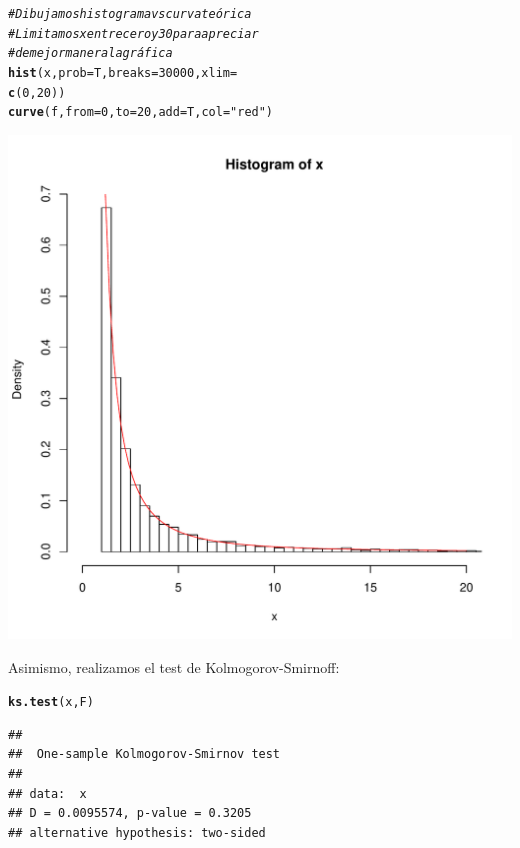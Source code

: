 \documentclass[12 pt]{article}\usepackage[]{graphicx}\usepackage[]{color}
\makeatletter
\def\maxwidth{ %
  \ifdim\Gin@nat@width>\linewidth
    \linewidth
  \else
    \Gin@nat@width
  \fi
}
\newcommand{\hlnum}[1]{\textcolor[rgb]{0.686,0.059,0.569}{#1}}%
\newcommand{\hlstr}[1]{\textcolor[rgb]{0.192,0.494,0.8}{#1}}%
\newcommand{\hlcom}[1]{\textcolor[rgb]{0.678,0.584,0.686}{\textit{#1}}}%
\newcommand{\hlstd}[1]{\textcolor[rgb]{0.345,0.345,0.345}{#1}}%
\newcommand{\hlkwc}[1]{\textcolor[rgb]{0.333,0.667,0.333}{#1}}%
\newcommand{\hlkwd}[1]{\textcolor[rgb]{0.737,0.353,0.396}{\textbf{#1}}}%
\newenvironment{kframe}{%
 \def\at@end@of@kframe{}%
 \ifinner\ifhmode%
  \def\at@end@of@kframe{\end{minipage}}%
  \begin{minipage}{\columnwidth}%
 \fi\fi%
 \def\FrameCommand##1{\hskip\@totalleftmargin \hskip-\fboxsep
 \colorbox{shadecolor}{##1}\hskip-\fboxsep
     \hskip-\linewidth \hskip-\@totalleftmargin \hskip\columnwidth}%
 \MakeFramed {\advance\hsize-\width
   \@totalleftmargin\z@ \linewidth\hsize
   \@setminipage}}%
 {\par\unskip\endMakeFramed%
 \at@end@of@kframe}
\newenvironment{knitrout}{}{} %
\makeatother
\begin{document}
\begin{enumerate}
\begin{knitrout}
\begin{kframe}
\begin{alltt}
    \hlcom{# Dibujamos histograma vs curva teórica   }
    \hlcom{# Limitamos x entre cero y 30 para apreciar }
    \hlcom{# de mejor manera la gráfica     }
    \hlkwd{hist}\hlstd{(x,}\hlkwc{prob}\hlstd{=T,} \hlkwc{breaks} \hlstd{=} \hlnum{30000}\hlstd{,} \hlkwc{xlim} \hlstd{=}
    \hlkwd{c}\hlstd{(}\hlnum{0}\hlstd{,}\hlnum{20}\hlstd{))}
    \hlkwd{curve}\hlstd{(f,}\hlkwc{from}\hlstd{=}\hlnum{0}\hlstd{,}\hlkwc{to}\hlstd{=}\hlnum{20}\hlstd{,}\hlkwc{add}\hlstd{=T,}\hlkwc{col}\hlstd{=}\hlstr{"red"}\hlstd{)}
\end{alltt}
\end{kframe}
\includegraphics[width=\maxwidth]{figure/unnamed-chunk-18-1} 

\end{knitrout}


Asimismo, realizamos el test de Kolmogorov-Smirnoff:

\begin{knitrout}
\color{fgcolor}\begin{kframe}
\begin{alltt}
    \hlkwd{ks.test}\hlstd{(x,F)}
\end{alltt}
\begin{verbatim}
## 
## 	One-sample Kolmogorov-Smirnov test
## 
## data:  x
## D = 0.0095574, p-value = 0.3205
## alternative hypothesis: two-sided
\end{verbatim}
\end{kframe}
\end{knitrout}


\end{enumerate}
\end{document}
